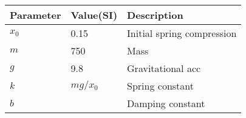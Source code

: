 \begin{tabular}{|l|l|l|}
\hline
\textbf{Parameter} & \textbf{Value(SI)} & \textbf{Description} \\ \hline
$x_{0}$ & 0.15 & Initial spring compression \\ \hline
$m$          & 750 & Mass              \\ \hline
$g$          & 9.8 & Gravitational acc \\ \hline
$k$          & $mg/x_{0}$ & Spring constant   \\ \hline
$b$          &  & Damping constant  \\ \hline
\end{tabular}
